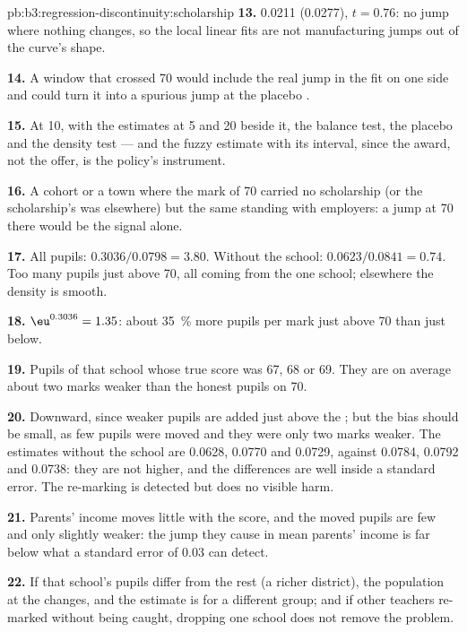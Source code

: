 \begin{solution}{pb:b3:regression-discontinuity:scholarship}
\textbf{13.} 0.0211 (0.0277), $t = 0.76$: no jump where nothing changes, so the
local linear fits are not manufacturing jumps out of the curve's shape.

\textbf{14.} A window that crossed 70 would include the real jump in the fit on
one side and could turn it into a spurious jump at the placebo .

\textbf{15.} At 10, with the estimates at 5 and 20 beside it, the balance test,
the placebo  and the density test --- and the fuzzy estimate with its
interval, since the award, not the offer, is the policy's instrument.

\textbf{16.} A cohort or a town where the mark of 70 carried no scholarship (or
the scholarship's  was elsewhere) but the same standing with employers: a
jump at 70 there would be the signal alone.

\textbf{17.} All pupils: $0.3036/0.0798 = 3.80$. Without the school: $0.0623/0.0841
= 0.74$. %
Too many pupils just above 70, all coming from the one school; elsewhere the
density is smooth.

\textbf{18.} $\eu^{0.3036} = 1.35$: about 35~\% more pupils per mark just above
70 than just below.

\textbf{19.} Pupils of that school whose true score was 67, 68 or 69. They are
on average about two marks weaker than the honest pupils on 70.

\textbf{20.} Downward, since weaker pupils are added just above the ; but
the bias should be small, as few pupils were moved and they were only two marks
weaker. The estimates without the school are 0.0628, 0.0770 and 0.0729, against
0.0784, 0.0792 and 0.0738: they are not higher, and the differences are well
inside a standard error. The re-marking is detected but does no visible harm.

\textbf{21.} Parents' income moves little with the score, and the moved pupils
are few and only slightly weaker: the jump they cause in mean parents' income is
far below what a standard error of 0.03 can detect.

\textbf{22.} If that school's pupils differ from the rest (a richer district), the
population at the  changes, and the estimate is for a different group; and
if other teachers re-marked without being caught, dropping one school does not
remove the problem.


\end{solution}
